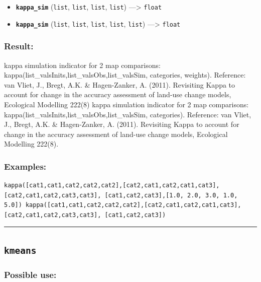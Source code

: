\documentclass[]{book}
\providecommand{\tightlist}{%
  \setlength{\itemsep}{0pt}\setlength{\parskip}{0pt}}
\theoremstyle{definition}
\theoremstyle{definition}
\theoremstyle{definition}
\theoremstyle{remark}
\begin{document}
\begin{itemize}
\tightlist
\item
  \textbf{\texttt{kappa\_sim}} (\texttt{list}, \texttt{list},
  \texttt{list}, \texttt{list}) ---\textgreater{} \texttt{float}
\item
  \textbf{\texttt{kappa\_sim}} (\texttt{list}, \texttt{list},
  \texttt{list}, \texttt{list}, \texttt{list}) ---\textgreater{}
  \texttt{float}
\end{itemize}

\subsubsection{Result:}\label{result-302}

kappa simulation indicator for 2 map comparisons:
kappa(list\_valsInits,list\_valsObs,list\_valsSim, categories, weights).
Reference: van Vliet, J., Bregt, A.K. \& Hagen-Zanker, A. (2011).
Revisiting Kappa to account for change in the accuracy assessment of
land-use change models, Ecological Modelling 222(8) kappa simulation
indicator for 2 map comparisons:
kappa(list\_valsInits,list\_valsObs,list\_valsSim, categories).
Reference: van Vliet, J., Bregt, A.K. \& Hagen-Zanker, A. (2011).
Revisiting Kappa to account for change in the accuracy assessment of
land-use change models, Ecological Modelling 222(8).

\subsubsection{Examples:}\label{examples-219}

\begin{verbatim}
kappa([cat1,cat1,cat2,cat2,cat2],[cat2,cat1,cat2,cat1,cat3],[cat2,cat1,cat2,cat3,cat3], [cat1,cat2,cat3],[1.0, 2.0, 3.0, 1.0, 5.0]) kappa([cat1,cat1,cat2,cat2,cat2],[cat2,cat1,cat2,cat1,cat3],[cat2,cat1,cat2,cat3,cat3], [cat1,cat2,cat3]) 
\end{verbatim}

\begin{center}\rule{0.5\linewidth}{\linethickness}\end{center}

\subsection{\texorpdfstring{\texttt{kmeans}}{kmeans}}\label{kmeans}

\subsubsection{Possible use:}\label{possible-use-313}
\end{document}
